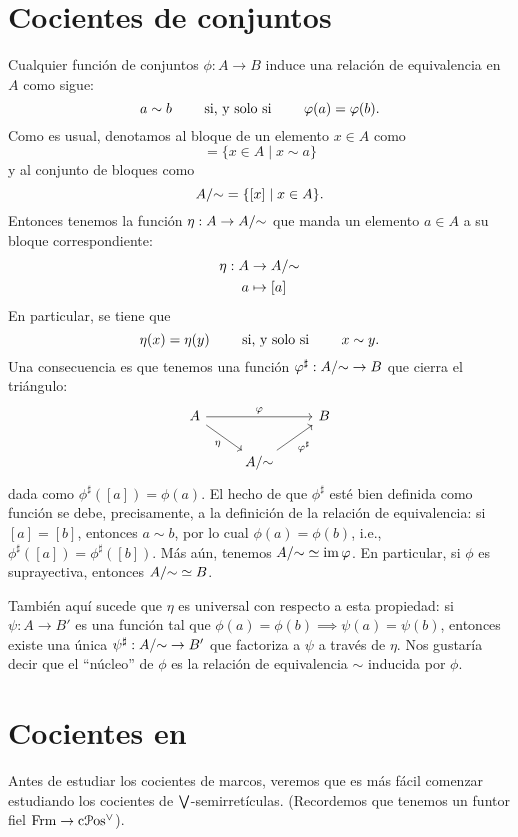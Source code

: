 \section{Cocientes de conjuntos}
Cualquier función de conjuntos $\phi:A\to B$ induce una relación de
equivalencia en $A$ como sigue:
\[
    a\sim b \qquad\text{ si, y solo si }\qquad \varphi(a) = \varphi(b)
.\]
Como es usual, denotamos al bloque de un elemento $x\in A$ como
\begin{equation}
  [a]=\{x\in A\mid x\sim a\}
\end{equation}
y al conjunto de bloques como
\begin{equation}
  A/{\sim}
  =
  \{[x] \mid x\in A\}
.\end{equation}
Entonces tenemos la función $\eta: A\to A/{\sim}$ que manda un
elemento $a\in A$ a su bloque correspondiente:
\begin{align*}
    \eta:A&\to A/{\sim} \\
    a&\mapsto [a]
\end{align*}
En particular, se tiene que
\[
    \eta(x) = \eta(y) \qquad\text{ si, y solo si }\qquad x\sim y
.\]
Una consecuencia es que tenemos una función
$\varphi^\sharp:A/{\sim} \to B$ que cierra el triángulo:
\[
\begin{tikzcd}
    A\ar[rr,"\phi"] \ar[dr,"\eta"'] && B \\
    & A/\simr \ar[ur,"\phi^\sharp"']
\end{tikzcd}
\]
dada como $\phi^\sharp([a]) = \phi(a)$.
El hecho de que $\phi^\sharp$ esté bien definida como función se debe,
precisamente, a la definición de la relación de equivalencia:
si $[a]=[b]$, entonces $a\sim b$, por lo cual $\phi(a)=\phi(b)$, i.e.,
$\phi^\sharp([a])=\phi^\sharp([b])$.
Más aún, tenemos $A/{\sim}\simeq \operatorname{im} \varphi$.
En particular, si $\phi$ es suprayectiva, entonces $A/{\sim} \simeq B$.

También aquí sucede que $\eta$ es universal con respecto a esta
propiedad: si $\psi:A\to B'$ es una función tal que
$\phi(a)=\phi(b)\implies \psi(a)=\psi(b)$,
entonces existe una única $\psi^\sharp:A/{\sim}\to B'$
que factoriza a $\psi$ a través de $\eta$.
Nos gustaría decir que el ``núcleo'' de $\phi$ es la relación de
equivalencia $\sim$ inducida por $\phi$.

\section{Cocientes en }
Antes de estudiar los cocientes de marcos, veremos que es más fácil
comenzar estudiando los cocientes de $\bigvee$-semirretículas.
(Recordemos que tenemos un funtor fiel $\mathrm{Frm}\to\mathrm{c}\mathcal{P}\mathrm{os}^\vee$).

